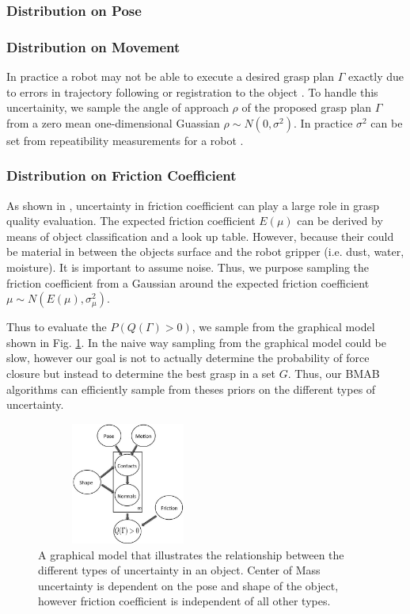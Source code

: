 \documentclass[letterpaper, 10 pt, conference]{ieeeconf}  %
\begin{document}
\subsubsection{Distribution on Pose}
 
 
 \subsubsection{Distribution on Movement}
 In practice a robot may not be able to execute a desired
grasp plan $\Gamma$ exactly due to errors in trajectory following or
registration to the object \cite{kehoe2012estimating}. To handle this uncertainity, we sample the angle of approach $\rho$ of the proposed grasp plan $\Gamma$ from a zero mean one-dimensional Guassian $\rho \sim N(0,\sigma^2)$. In practice $\sigma^2$ can be set from repeatibility measurements for a robot \cite{mooring1986determination}.

 
 \subsubsection{Distribution on Friction Coefficient}
As shown in \cite{zheng2005}, uncertainty in friction coefficient can play a large role in grasp quality evaluation. The expected friction coefficient $E(\mu)$ can be derived by means of object classification and a look up table. However, because their could be material in between the objects surface and the robot gripper (i.e. dust, water, moisture). It is important to assume noise.  Thus, we purpose sampling the friction coefficient from a Gaussian around the expected friction coefficient $\mu \sim N(E(\mu),\sigma_{\mu}^2)$. 
 
 
Thus to evaluate the $P(Q(\Gamma)>0)$, we sample from the graphical model shown in Fig. \ref{fig:graphical_model}. In the naive way sampling from the graphical model could be slow, however our goal is not to actually determine the probability of force closure but instead to determine the best grasp in a set $G$. Thus, our BMAB algorithms can efficiently sample from theses priors on the different types of uncertainty.  
 
 
 



\begin{figure}[ht!]
\centering
\includegraphics[width = 6cm, height = 4cm]{figures/Slide8.jpg}
\caption{A graphical model that illustrates the relationship between the different types of uncertainty in an object. Center of Mass uncertainty is dependent on the pose and shape of the object, however friction coefficient is independent of all other types. }
\vspace*{-10pt}
\label{fig:graphical_model}
\end{figure}
\end{document}
